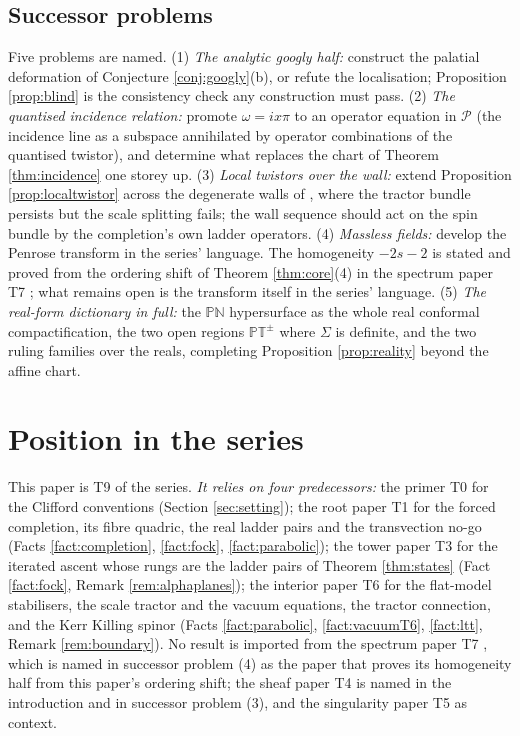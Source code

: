 \documentclass[11pt]{article}
\theoremstyle{definition}
\newcommand{\PT}{\mathbb{PT}}
\begin{document}
\subsection*{Successor problems}

Five problems are named. (1) \emph{The analytic googly half:} construct the palatial deformation of Conjecture \ref{conj:googly}(b), or refute the localisation; Proposition \ref{prop:blind} is the consistency check any construction must pass. (2) \emph{The quantised incidence relation:} promote $\omega = ix\pi$ to an operator equation in $\mathcal{P}$ (the incidence line as a subspace annihilated by operator combinations of the quantised twistor), and determine what replaces the chart of Theorem \ref{thm:incidence} one storey up. (3) \emph{Local twistors over the wall:} extend Proposition \ref{prop:localtwistor} across the degenerate walls of \cite{ButlerT4}, where the tractor bundle persists but the scale splitting fails; the wall sequence should act on the spin bundle by the completion's own ladder operators. (4) \emph{Massless fields:} develop the Penrose transform in the series' language. The homogeneity $-2s-2$ is stated and proved from the ordering shift of Theorem \ref{thm:core}(4) in the spectrum paper T7 \cite[Prop.~5.2]{ButlerT7}; what remains open is the transform itself in the series' language. (5) \emph{The real-form dictionary in full:} the $\mathbb{PN}$ hypersurface as the whole real conformal compactification, the two open regions $\PT^\pm$ where $\Sigma$ is definite, and the two ruling families over the reals, completing Proposition \ref{prop:reality} beyond the affine chart.

\section{Position in the series}\label{sec:position}

This paper is T9 of the series. \emph{It relies on four predecessors:} the primer T0 \cite{ButlerT0} for the Clifford conventions (Section \ref{sec:setting}); the root paper T1 \cite{ButlerT1} for the forced completion, its fibre quadric, the real ladder pairs and the transvection no-go (Facts \ref{fact:completion}, \ref{fact:fock}, \ref{fact:parabolic}); the tower paper T3 \cite{ButlerT3} for the iterated ascent whose rungs are the ladder pairs of Theorem \ref{thm:states} (Fact \ref{fact:fock}, Remark \ref{rem:alphaplanes}); the interior paper T6 \cite{ButlerT6} for the flat-model stabilisers, the scale tractor and the vacuum equations, the tractor connection, and the Kerr Killing spinor (Facts \ref{fact:parabolic}, \ref{fact:vacuumT6}, \ref{fact:ltt}, Remark \ref{rem:boundary}). No result is imported from the spectrum paper T7 \cite{ButlerT7}, which is named in successor problem (4) as the paper that proves its homogeneity half from this paper's ordering shift; the sheaf paper T4 \cite{ButlerT4} is named in the introduction and in successor problem (3), and the singularity paper T5 \cite{ButlerT5} as context.
\end{document}
